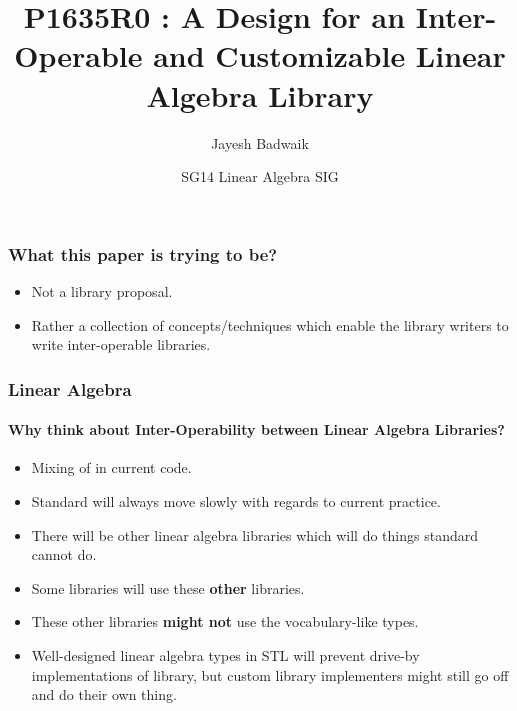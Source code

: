 \documentclass[dvipsnames,10pt]{jbeamer}
\title[P1635R0]{P1635R0 : A Design for an Inter-Operable and Customizable Linear
Algebra Library}
\author{Jayesh Badwaik}
\date{SG14 Linear Algebra SIG}
\begin{document}
\maketitle

\begin{frame}
  \frametitle{What this paper is trying to be?}

  \begin{itemize}
    \item Not a library proposal.
    \item Rather a collection of concepts/techniques which enable the library
      writers to write inter-operable libraries.
  \end{itemize}
\end{frame}

\begin{frame}
  \frametitle{Linear Algebra}
  \framesubtitle{Why think about Inter-Operability between Linear Algebra
  Libraries?}

  \vspace{0.5cm}
  \begin{itemize}
    \item Mixing of  in current code.
    \item Standard will always move slowly with regards to current practice.
    \item There will be other linear algebra libraries which will do things
      standard cannot do.
    \item Some libraries will use these \textbf{other} libraries.
    \item These other libraries \textbf{might not} use the vocabulary-like
      types.
    \item Well-designed linear algebra types in STL will prevent drive-by
      implementations of library, but custom library implementers might still go
      off and do their own thing.
  \end{itemize}
\end{frame}
\end{document}
